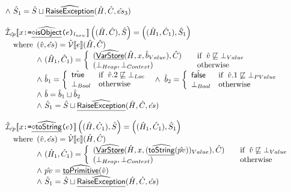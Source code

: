 \[\begin{array}{ll}
{   \land\ \hat{S}_1 = \hat{S}\sqcup\widehat{\underline{\sf RaiseException}}(\hat{H},\hat{C}, \hat{es}_3)
 }
\\
\\
\hat{\mathcal{I}}_{\hat{cp}}\llbracket x \mbox{\texttt{:=}} \widehat{\underline{\sf \diamond isObject}}\mbox{\texttt{(}}e\mbox{\texttt{)}}_{l_{new}} \rrbracket \left((\hat{H},\hat{C}),\hat{S}\right)
 = \left((\hat{H}_1,\hat{C}_1),\hat{S}_1\right)\\
 \quad{\rm where}\begin{array}[t]{l}
   (\hat{v},\hat{es})=\hat{\mathcal{V}}\llbracket e\rrbracket(\hat{H},\hat{C})\\
   \land\ (\hat{H}_1, \hat{C}_1) = \left\{
     \begin{array}{ll}
       (\widehat{\underline{\sf VarStore}}(\hat{H},x,\hat{b}_{Value}), \hat{C})
       & \quad{\rm if}\begin{array}[t]{l}\hat{v}\not\sqsubseteq\bot_{Value}\end{array} \\
       (\bot_{Heap}, \bot_{Context}) & \quad{\rm otherwise}
     \end{array}
   \right.\\
   \land\ \hat{b}_1 = \left\{
     \begin{array}{ll}
       \hat{\mbox{\textsf{true}}} & {\rm if}\begin{array}[t]{l}\hat{v}.2 \not\sqsubseteq \bot_{Loc}\end{array} \\
       \bot_{Bool} & {\rm otherwise} \\
     \end{array}
   \right. 
   \land\ \hat{b}_2 = \left\{
     \begin{array}{ll}
       \hat{\mbox{\textsf{false}}} & {\rm if}\begin{array}[t]{l}\hat{v}.1 \not\sqsubseteq \bot_{PValue}\end{array} \\
       \bot_{Bool} & {\rm otherwise} \\
     \end{array}
   \right. \\
   \land\ \hat{b} = \hat{b}_1 \sqcup \hat{b}_2 \\
   \land\ \hat{S}_1 = \hat{S}\sqcup\widehat{\underline{\sf RaiseException}}(\hat{H},\hat{C}, \hat{es})
 \end{array}
\\
\\

\hat{\mathcal{I}}_{\hat{cp}}\llbracket x \mbox{\texttt{:=}} \widehat{\underline{\sf \diamond toString}}\mbox{\texttt{(}}e\mbox{\texttt{)}} \rrbracket \left((\hat{H},\hat{C}_1),\hat{S}\right)
= \left((\hat{H}_1,\hat{C}_1),\hat{S}_1\right)
\\\quad{\rm where}\begin{array}[t]{l}
  (\hat{v},\hat{es}) = \hat{\mathcal{V}}\llbracket e\rrbracket(\hat{H},\hat{C})\\
  \land\ (\hat{H}_1, \hat{C}_1) = \left\{
     \begin{array}{ll}
       (\widehat{\underline{\sf VarStore}}(\hat{H},x,(\widehat{\underline{\sf toString}}(\hat{pv}))_{Value}), \hat{C})
       & \quad{\rm if}\begin{array}[t]{l}\hat{v}\not\sqsubseteq\bot_{Value}\end{array} \\
       (\bot_{Heap}, \bot_{Context}) & \quad{\rm otherwise}
     \end{array}\right.\\
  \land\ \hat{pv}=\widehat{\underline{\sf toPrimitive}}(\hat{v})\\
  \land\ \hat{S}_1 = \hat{S}\sqcup\widehat{\underline{\sf RaiseException}}(\hat{H},\hat{C}, \hat{es})
\end{array}\\
\\
\end{array}
\]
